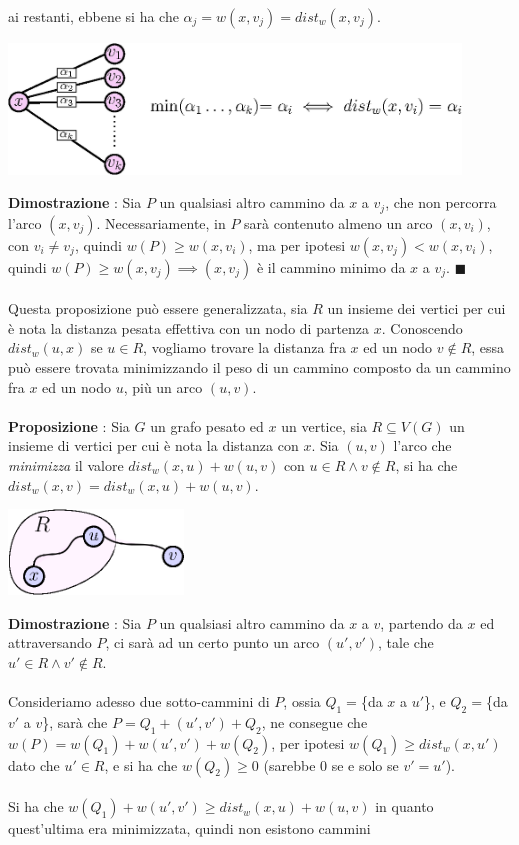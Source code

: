 \documentclass[12pt, letterpaper]{article}
\newcommand{\acc}{\\\hphantom{}\\}
\begin{document}
ai restanti, ebbene si ha che $\alpha_j=w(x,v_j)=dist_w(x,v_j)$. \begin{center}
    \includegraphics[width=0.9\textwidth ]{images/distNodiVicini.eps}
\end{center}
\textbf{Dimostrazione} : Sia $P$ un qualsiasi altro cammino da $x$ a $v_j$, che non percorra l'arco
$(x,v_j)$. Necessariamente, in $P$ sarà contenuto almeno un arco $(x,v_i)$, con $v_i\ne v_j$, quindi
$w(P)\ge w(x,v_i)$, ma per ipotesi $w(x,v_j)<w(x,v_i)$, quindi $w(P)\ge w(x,v_j)\implies(x,v_j)$ è il cammino minimo
da $x$ a $v_j$. $\blacksquare$\acc
Questa proposizione può essere generalizzata, sia $R$ un insieme dei vertici per cui è nota la distanza pesata effettiva con un
nodo di partenza $x$. Conoscendo $dist_w(u,x)$ se $u\in R$, vogliamo trovare la distanza fra $x$ ed un nodo $v\notin R$,
essa può essere trovata minimizzando il peso di un cammino composto da un cammino fra $x$ ed un nodo $u$, più un arco
$(u,v)$.\acc
\textbf{Proposizione} : Sia $G$ un grafo pesato ed $x$ un vertice, sia $R\subseteq V(G)$ un insieme di vertici per cui
è nota la distanza con $x$. Sia $(u,v)$ l'arco che \textit{minimizza} il valore $dist_w(x,u)+w(u,v)$ con $u\in R \land v\notin R$,
si ha che $dist_w(x,v)=dist_w(x,u)+w(u,v)$.\begin{center}
    \includegraphics[width=0.35\textwidth ]{images/insiemeR.eps}
\end{center}
\textbf{Dimostrazione} : Sia $P$ un qualsiasi altro cammino da $x$ a $v$, partendo da $x$ ed attraversando $P$, ci
sarà ad un certo punto un arco $(u',v')$, tale che $u'\in R\land v'\notin R$. \acc Consideriamo adesso due sotto-cammini di
$P$, ossia $Q_1=$\{da $x$ a $u'$\}, e $Q_2=$\{da $v'$ a $v$\}, sarà che $P=Q_1+(u',v')+Q_2$, ne consegue che
$w(P)=w(Q_1)+w(u',v')+w(Q_2)$, per ipotesi $w(Q_1)\ge dist_w(x,u')$ dato che $u'\in R$, e si ha che $w(Q_2)\ge 0$ (sarebbe 0
se e solo se $v'=u'$).\acc
Si ha che $w(Q_1)+w(u',v')\ge dist_w(x,u)+w(u,v)$ in quanto quest'ultima era minimizzata, quindi non esistono cammini
\end{document}
